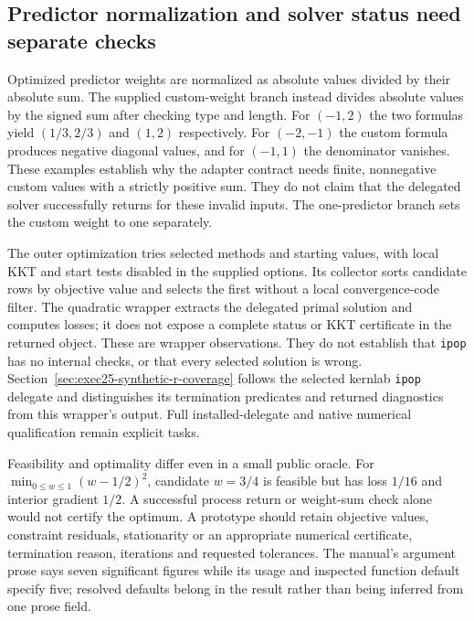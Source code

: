 \subsection{Predictor normalization and solver status need separate checks}
Optimized predictor weights are normalized as absolute values divided by
their absolute sum. The supplied custom-weight branch instead divides
absolute values by the signed sum after checking type and length.
For $(-1,2)$ the two formulas yield $(1/3,2/3)$ and $(1,2)$ respectively.
For $(-2,-1)$ the custom formula produces negative diagonal values, and
for $(-1,1)$ the denominator vanishes. These examples establish why
the adapter contract needs finite, nonnegative custom values with a
strictly positive sum. They do not claim that the delegated solver
successfully returns for these invalid inputs. The one-predictor branch
sets the custom weight to one separately.
\citep{exec24_synth_source,exec24_synth_choice}

The outer optimization tries selected methods and starting values,
with local KKT and start tests disabled in the supplied options. Its
collector sorts candidate rows by objective value and selects the first
without a local convergence-code filter. The quadratic wrapper extracts
the delegated primal solution and computes losses; it does not expose a
complete status or KKT certificate in the returned object. These are
wrapper observations. They do not establish that \texttt{ipop} has no
internal checks, or that every selected solution is wrong.
Section~\ref{sec:exec25-synthetic-r-coverage} follows the selected kernlab
\texttt{ipop} delegate and distinguishes its termination predicates and
returned diagnostics from this wrapper's output. Full installed-delegate
and native numerical qualification remain explicit tasks.
\citep{exec24_synth_source}

Feasibility and optimality differ even in a small public oracle. For
$\min_{0\leq w\leq1}(w-1/2)^2$, candidate $w=3/4$ is feasible but has
loss $1/16$ and interior gradient $1/2$. A successful process return or
weight-sum check alone would not certify the optimum. A prototype should
retain objective values, constraint residuals, stationarity or an appropriate
numerical certificate, termination reason, iterations and requested
tolerances. The manual's argument prose says seven significant figures
while its usage and inspected function default specify five; resolved
defaults belong in the result rather than being inferred from one prose field.
\citep{exec24_synth_source,exec24_synth_choice}

